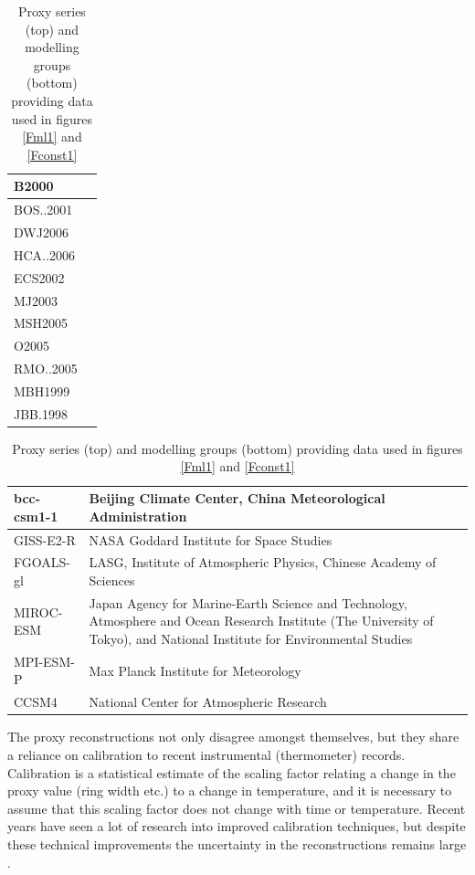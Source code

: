 \documentclass[CP]{copernicus}
\begin{document}
\begin{table}[!hbp]
\begin{tabular}{|p{3cm}|p{7cm}|}
\hline
B2000 & \citet{briffa00holocene,briffa04treerings} \\
\hline
BOS..2001 & \citet{briffa01ageband} \\
\hline
DWJ2006 & \citet{darrigo06context} \\
\hline
HCA..2006 & \citet{hegerl06climsens} \\
\hline
ECS2002 & \citet{esper02paleo,cook04millennium} \\
\hline
MJ2003 & \citet{mann03twok} \\
\hline
MSH2005 & \citet{moberg05proxy} \\
\hline
O2005 & \citet{oerlemans05climate} \\
\hline
RMO..2005 & \citet{rutherford05proxy} \\
\hline
MBH1999 & \citet{mann99} \\
\hline
JBB.1998 & \citet{jones98proxy,jones01millennium} \\
\hline
\end{tabular}

\vspace{0.5cm}
\begin{tabular}{|p{3cm}|p{7cm}|}
\hline
bcc-csm1-1 & Beijing Climate Center, China Meteorological Administration \citep{wu12bcc}\\
\hline
GISS-E2-R & NASA Goddard Institute for Space Studies \citep{schmidt06giss}\\
\hline
FGOALS-gl & LASG, Institute of Atmospheric Physics, Chinese Academy of Sciences \citep{zhou08fgoals} \\
\hline
MIROC-ESM & Japan Agency for Marine-Earth Science and Technology, Atmosphere and Ocean Research Institute (The University of Tokyo), and National Institute for Environmental Studies \citep{watanabe10mirocesm} \\
\hline
MPI-ESM-P & Max Planck Institute for Meteorology \citep{raddatz07carbon,marsland03mpisim}\\
\hline
CCSM4 & National Center for Atmospheric Research \citep{gent11ccsm4} \\
\hline
\end{tabular}

\caption{Proxy series (top) and modelling groups (bottom) providing data used in figures \ref{Fml1} and \ref{Fconst1}}
\label{Tcredit}
\end{table}

The proxy reconstructions not only disagree amongst themselves, but they share a reliance on calibration to recent instrumental (thermometer) records. Calibration is a statistical estimate of the scaling factor relating a change in the proxy value (ring width etc.) to a change in temperature, and it is necessary to assume that this scaling factor does not change with time or temperature. Recent years have seen a lot of research into improved calibration techniques, but despite these technical improvements the uncertainty in the reconstructions remains large \citep{frank10noodle,jones09millennium}.
\end{document}
